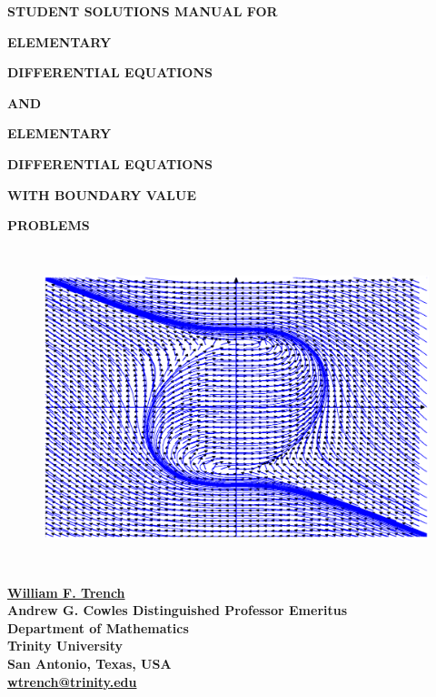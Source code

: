 \documentclass[dvips]{book}
\numberwithin{example}{section}
\numberwithin{equation}{section}
\numberwithin{theorem}{section}
\numberwithin{table}{section}
\numberwithin{figure}{section}
\begin{document}
\thispagestyle{empty}
\begin{center}
{\bf\large STUDENT SOLUTIONS MANUAL FOR}
 \vspace{.2in}



{\bf\Huge ELEMENTARY}
\smallskip

{\bf\Huge DIFFERENTIAL EQUATIONS}

\smallskip

{\bf\large AND}

\smallskip

{\bf\Huge ELEMENTARY}

\smallskip

{\bf\Huge DIFFERENTIAL EQUATIONS}

\smallskip



{\bf\Huge WITH BOUNDARY VALUE}

\smallskip

{\bf\Huge PROBLEMS}



\begin{figure}[H]
  \centering
  \includegraphics[bb=-78 148 689 643,width=5.67in,height=3.66in,keepaspectratio]{cover}
\end{figure}



\bf\huge
\href{http://ramanujan.math.trinity.edu/wtrench/index.shtml}
{William F. Trench}
\\\large
Andrew G. Cowles Distinguished Professor Emeritus\\
Department of Mathematics\\
Trinity University \\
San Antonio, Texas, USA\\
\href{mailto:{wtrench@trinity.edu}}
{wtrench@trinity.edu}
\large



\end{center}
\end{document}
